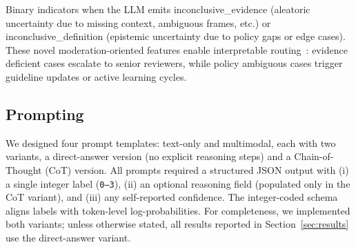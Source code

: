 Binary indicators when the LLM emits \textsf{inconclusive\_evidence} (aleatoric uncertainty due to missing context, ambiguous frames, etc.) or \textsf{inconclusive\_definition} (epistemic uncertainty due to policy gaps or edge cases). These novel moderation-oriented features enable interpretable routing~\cite{kendall+al:17}: evidence deficient cases escalate to senior reviewers, while policy ambiguous cases trigger guideline updates or active learning cycles.

\subsection{Prompting}
\label{subsec:prompting}
We designed four prompt templates: text-only and multimodal, each with two variants, a direct-answer version (no explicit reasoning steps) and a Chain-of-Thought (CoT) version. All prompts required a structured JSON output with (i) a single integer label (\texttt{0--3}), (ii) an optional reasoning field (populated only in the CoT variant), and (iii) any self-reported confidence. The integer-coded schema aligns labels with token-level log-probabilities. For completeness, we implemented both variants; unless otherwise stated, all results reported in Section~\ref{sec:results} use the direct-answer variant.
